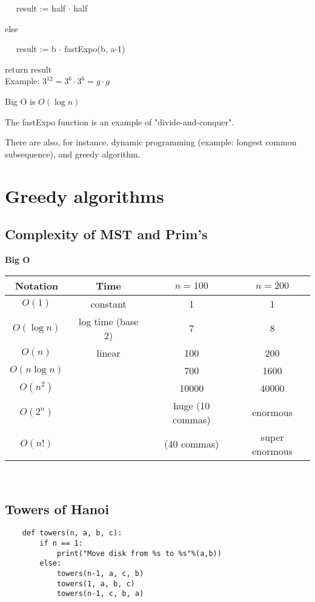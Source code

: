 \documentclass[english,openany]{book}
\begin{document}
    $\quad$ result := half $\cdot$ half

    else

    $\quad$ result := b $\cdot$ fastExpo(b, a-1)

    return result\\

    Example: $3^{12} = 3^6 \cdot 3^6 = g \cdot g$

    Big O is $O(\log n)$

    The fastExpo function is an example of "divide-and-conquer".

    There are also, for instance, dynamic programming (example: longest common subsequence), and greedy algorithm.

    \section{Greedy algorithms}

    \subsection{Complexity of MST and Prim's}

    \textbf{Big O}

    \begin{tabular}{c|c|cc}
        Notation&Time&$n=100$&$n=200$\\
        \hline
        $O(1)$&constant&1&1\\
        $O(\log n)$&log time (base 2)&7&8\\
        $O(n)$&linear&100&200\\
        $O(n \log n)$&&700&1600\\
        $O(n^2)$&&10000&40000\\
        $O(2^n)$&&huge (10 commas)&enormous\\
        $O(n!)$&&(40 commas)&super enormous\\
    \end{tabular}\\

    \subsection{Towers of Hanoi}

    \begin{lstlisting}
    def towers(n, a, b, c):
        if n == 1:
            print("Move disk from %s to %s"%(a,b))
        else:
            towers(n-1, a, c, b)
            towers(1, a, b, c)
            towers(n-1, c, b, a)
    \end{lstlisting}
\end{document}
